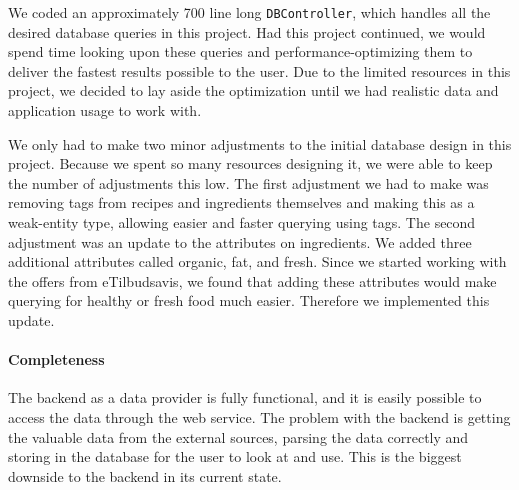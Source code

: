 We coded an approximately 700 line long \texttt{DBController}, which handles all the desired database queries in this project. Had this project continued, we would spend time looking upon these queries and performance-optimizing them to deliver the fastest results possible to the user. Due to the limited resources in this project, we decided to lay aside the optimization until we had realistic data and application usage to work with. 

We only had to make two minor adjustments to the initial database design in this project. Because we spent so many resources designing it, we were able to keep the number of adjustments this low. The first adjustment we had to make was removing tags from recipes and ingredients themselves and making this as a weak-entity type, allowing easier and faster querying using tags. The second adjustment was an update to the attributes on ingredients. We added three additional attributes called organic, fat, and fresh. Since we started working with the offers from eTilbudsavis\cite{etilbudsavis}, we found that adding these attributes would make querying for healthy or fresh food much easier. Therefore we implemented this update.

\paragraph{Completeness}
The backend as a data provider is fully functional, and it is easily possible to access the data through the web service. The problem with the backend is  getting the valuable data from the external sources, parsing the data correctly and storing in the database for the user to look at and use. This is the biggest downside to the backend in its current state.